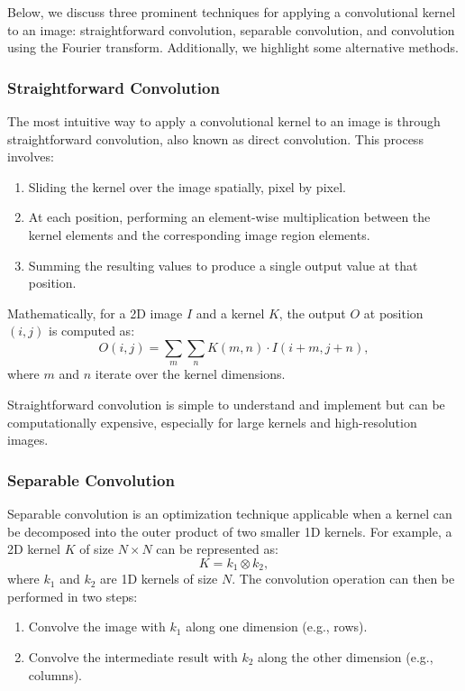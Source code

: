 \documentclass[11pt]{book}
\begin{document}
Below, we discuss three prominent techniques for applying a convolutional kernel to an image: straightforward convolution, separable convolution, and convolution using the Fourier transform. Additionally, we highlight some alternative methods.

\subsubsection{Straightforward Convolution}
The most intuitive way to apply a convolutional kernel to an image is through straightforward convolution, also known as direct convolution. This process involves:
\begin{enumerate}
    \item Sliding the kernel over the image spatially, pixel by pixel.
    \item At each position, performing an element-wise multiplication between the kernel elements and the corresponding image region elements.
    \item Summing the resulting values to produce a single output value at that position.
\end{enumerate}

Mathematically, for a 2D image $I$ and a kernel $K$, the output $O$ at position $(i, j)$ is computed as:
\begin{equation}
O(i, j) = \sum_{m} \sum_{n} K(m, n) \cdot I(i+m, j+n),
\end{equation}
where $m$ and $n$ iterate over the kernel dimensions.

Straightforward convolution is simple to understand and implement but can be computationally expensive, especially for large kernels and high-resolution images.

\subsubsection{Separable Convolution}
Separable convolution is an optimization technique applicable when a kernel can be decomposed into the outer product of two smaller 1D kernels. For example, a 2D kernel $K$ of size $N \times N$ can be represented as:
\begin{equation}
K = k_1 \otimes k_2,
\end{equation}
where $k_1$ and $k_2$ are 1D kernels of size $N$. The convolution operation can then be performed in two steps:
\begin{enumerate}
    \item Convolve the image with $k_1$ along one dimension (e.g., rows).
    \item Convolve the intermediate result with $k_2$ along the other dimension (e.g., columns).
\end{enumerate}
\end{document}
